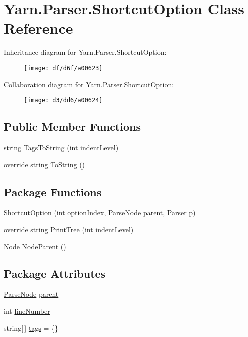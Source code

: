 \hypertarget{a00135}{\section{Yarn.\-Parser.\-Shortcut\-Option Class Reference}
\label{a00135}
}


Inheritance diagram for Yarn.\-Parser.\-Shortcut\-Option\-:
\nopagebreak
\begin{figure}[H]
\begin{center}
\leavevmode
\texttt{[image: df/d6f/a00623]}
\end{center}
\end{figure}


Collaboration diagram for Yarn.\-Parser.\-Shortcut\-Option\-:
\nopagebreak
\begin{figure}[H]
\begin{center}
\leavevmode
\texttt{[image: d3/dd6/a00624]}
\end{center}
\end{figure}
\subsection*{Public Member Functions}
\begin{DoxyCompactItemize}
\item 
string \hyperlink{a00122_a054f36c80d5eeacd569a8859f599af67}{Tags\-To\-String} (int indent\-Level)
\item 
override string \hyperlink{a00122_a18c67cb16090d0889bb9d6c8c6c565f8}{To\-String} ()
\end{DoxyCompactItemize}
\subsection*{Package Functions}
\begin{DoxyCompactItemize}
\item 
\hyperlink{a00135_a2c80b137d65f31b24533987233074605}{Shortcut\-Option} (int option\-Index, \hyperlink{a00122}{Parse\-Node} \hyperlink{a00122_af313a82103fcc2ff5a177dbb06b92f7b}{parent}, \hyperlink{a00123}{Parser} p)
\item 
override string \hyperlink{a00135_a529a2ef1aa6d7226db4ea7f3ea92b8c2}{Print\-Tree} (int indent\-Level)
\item 
\hyperlink{a00112}{Node} \hyperlink{a00122_a580e520a29444fc23ac3660cbe514a09}{Node\-Parent} ()
\end{DoxyCompactItemize}
\subsection*{Package Attributes}
\begin{DoxyCompactItemize}
\item 
\hyperlink{a00122}{Parse\-Node} \hyperlink{a00122_af313a82103fcc2ff5a177dbb06b92f7b}{parent}
\item 
int \hyperlink{a00122_a18b493382de0fde5b4299c1bd2250075}{line\-Number}
\item 
string\mbox{[}$\,$\mbox{]} \hyperlink{a00122_a58b3a15788fd2d4127d73619dc6d04ae}{tags} = \{\}
\end{DoxyCompactItemize}
